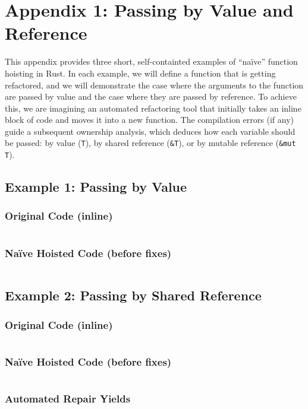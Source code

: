 \section{Appendix 1: Passing by Value and Reference}

This appendix provides three short, self-containted examples of ``na\"ive''
function hoisting in Rust. In each example, we will define a function that is
getting refactored, and we will demonstrate the case where the arguments to the
function are passed by value and the case where they are passed by reference. To
achieve this, we are imagining an automated refactoring tool that initially
takes an inline block of code and moves it into a new function. The compilation
errors (if any) guide a subsequent ownership analysis, which deduces how each
variable should be passed: by value (\texttt{T}), by shared reference
(\texttt{\&T}), or by mutable reference (\texttt{\&mut T}).

\subsection{Example 1: Passing by Value}
\subsubsection*{Original Code (inline)}
\inputminted{rust}{6_appendices/app1_code/ex1_oc.rs}

\subsubsection*{Na\"ive Hoisted Code (before fixes)}
\inputminted{rust}{6_appendices/app1_code/ex1_nhs.rs}

\subsection{Example 2: Passing by Shared Reference}
\subsubsection*{Original Code (inline)}
\inputminted{rust}{6_appendices/app1_code/ex2_oc.rs}

\subsubsection*{Na\"ive Hoisted Code (before fixes)}
\inputminted{rust}{6_appendices/app1_code/ex2_nhs.rs}

\subsubsection*{Automated Repair Yields}
\inputminted{rust}{6_appendices/app1_code/ex2_ar.rs}

